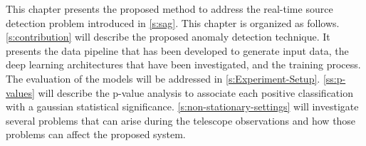 \begin{chapabstract}
\small{
This chapter presents the proposed method to address the real-time source detection problem introduced in \autoref{s:sag}. This chapter is organized as follows. \autoref{s:contribution} will describe the proposed anomaly detection technique. It presents the data pipeline that has been developed to generate input data, the deep learning architectures that have been investigated, and the training process. The evaluation of the models will be addressed in \autoref{s:Experiment-Setup}. \autoref{ss:p-values} will describe the p-value analysis to associate each positive classification with a gaussian statistical significance. \autoref{s:non-stationary-settings} will investigate several problems that can arise during the telescope observations and how those problems can affect the proposed system. 
}\\
\begin{center}
\noindent\makebox[0.8\linewidth]{\rule{0.66\paperwidth}{0.4pt}}
\end{center}
\vspace{1cm}
\end{chapabstract}

